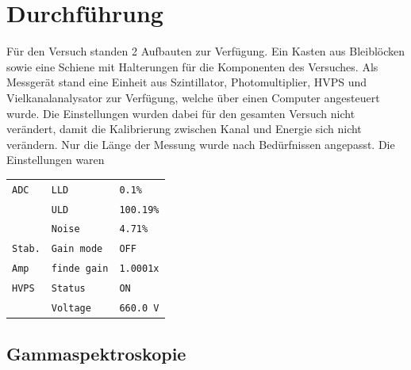 
\section{Durchführung} \label{Durchführung}

Für den Versuch standen 2 Aufbauten zur Verfügung. Ein Kasten aus Bleiblöcken sowie eine Schiene mit Halterungen für die Komponenten des Versuches. Als Messgerät stand eine Einheit aus Szintillator, Photomultiplier, HVPS und Vielkanalanalysator zur Verfügung, welche über einen Computer angesteuert wurde.
Die Einstellungen wurden dabei für den gesamten Versuch nicht verändert, damit die Kalibrierung zwischen Kanal und Energie sich nicht verändern. Nur die Länge der Messung wurde nach Bedürfnissen angepasst. Die Einstellungen waren

\begin{center}
    \begin{tabular}{lll}
        \texttt{ADC}\hspace{1.5cm} & \texttt{LLD} & \texttt{0.1\%} \\
        & \texttt{ULD} & \texttt{100.19\%} \\
        & \texttt{Noise} & \texttt{4.71\%} \\
        \texttt{Stab.} & \texttt{Gain mode} & \texttt{OFF} \\
        \texttt{Amp} & \texttt{finde gain} & \texttt{1.0001x}\\
        \texttt{HVPS} & \texttt{Status} & \texttt{ON} \\
        & \texttt{Voltage} & \texttt{660.0 V} \\
    \end{tabular}
\end{center}

\subsection{Gammaspektroskopie}

